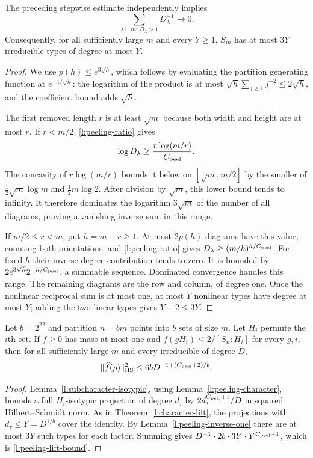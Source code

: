 \begin{lemma}
\label{l:peeling-inverse-one}
The preceding stepwise estimate independently implies
\[
 \sum_{\lambda\vdash m:\,D_\lambda>1}D_\lambda^{-1}\longrightarrow0.
\]
Consequently, for all sufficiently large $m$ and every $Y\ge1$,
$S_m$ has at most $3Y$ irreducible types of degree at most $Y$.
\end{lemma}
\begin{proof}
We use $p(h)\le e^{3\sqrt h}$, which follows by evaluating the
partition generating function at $e^{-1/\sqrt h}$: the logarithm
of the product is at most
$\sqrt h\sum_{j\ge1}j^{-2}\le2\sqrt h$, and the coefficient
bound adds $\sqrt h$.

The first removed length $r$ is at least $\sqrt m$ because both
width and height are at most $r$.  If $r<m/2$,
\eqref{l:peeling-ratio} gives
\[
 \log D_\lambda\ge
       \frac{r\log(m/r)}{C_{\rm peel}}.
\]
The concavity of $r\log(m/r)$ bounds it below on
$[\sqrt m,m/2]$ by the smaller of
$\frac12\sqrt m\log m$ and $\frac12m\log2$.
After division by $\sqrt m$, this lower bound tends to infinity.
It therefore dominates the logarithm $3\sqrt m$ of the number of
all diagrams, proving a vanishing inverse sum in this range.

If $m/2\le r<m$, put $h=m-r\ge1$.  At most $2p(h)$ diagrams
have this value, counting both orientations, and
\eqref{l:peeling-ratio} gives
$D_\lambda\ge(m/h)^{h/C_{\rm peel}}$.
For fixed $h$ their inverse-degree contribution tends to zero.  It
is bounded by
$2e^{3\sqrt h}2^{-h/C_{\rm peel}}$, a summable sequence.
Dominated convergence handles this range.  The remaining diagrams
are the row and column, of degree one.  Once the nonlinear reciprocal
sum is at most one, at most $Y$ nonlinear types have degree at most
$Y$; adding the two linear types gives $Y+2\le3Y$.
\end{proof}

\begin{corollary}
\label{l:peeling-lift}
Let $b=2^{22}$ and partition $n=bm$ points into $b$ sets of size
$m$.  Let $H_i$ permute the $i$th set.  If $f\ge0$ has mass at
most one and $f(gH_i)\le2/[S_n:H_i]$ for every $g,i$, then for
all sufficiently large $m$ and every irreducible of degree $D$,
\begin{equation}\label{l:peeling-lift-bound}
 \|\widehat f(\rho)\|_{\mathrm{HS}}^2
 \le6bD^{-1+(C_{\rm peel}+2)/b}.
\end{equation}
\end{corollary}
\begin{proof}
Lemma~\ref{l:subcharacter-isotypic}, using
Lemma~\ref{l:peeling-character}, bounds a full $H_i$-isotypic
projection of degree $d_\tau$ by
$2d_\tau^{C_{\rm peel}+1}/D$ in squared Hilbert--Schmidt norm.
As in Theorem~\ref{l:character-lift}, the projections with
$d_\tau\le Y=D^{1/b}$ cover the identity.  By
Lemma~\ref{l:peeling-inverse-one} there are at most $3Y$ such
types for each factor.  Summing gives
$D^{-1}\cdot2b\cdot3Y\cdot Y^{C_{\rm peel}+1}$,
which is \eqref{l:peeling-lift-bound}.
\end{proof}

